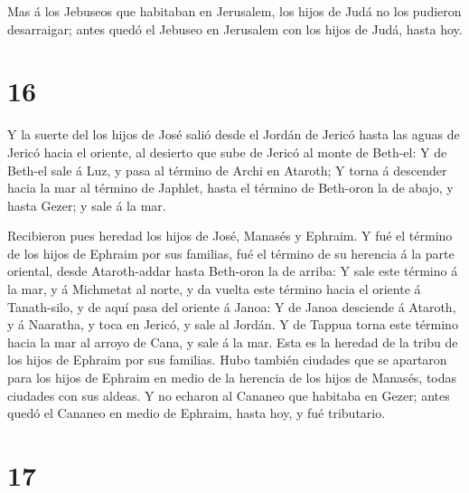  Mas á los Jebuseos que habitaban en Jerusalem, los hijos
de Judá no los pudieron desarraigar; antes quedó el Jebuseo en Jerusalem
con los hijos de Judá, hasta hoy.

\hypertarget{section-15}{%
\section{16}\label{section-15}}

 Y la suerte del los hijos de José salió desde el Jordán de
Jericó hasta las aguas de Jericó hacia el oriente, al desierto que sube
de Jericó al monte de Beth-el:  Y de Beth-el sale á Luz, y
pasa al término de Archi en Ataroth;  Y torna á descender
hacia la mar al término de Japhlet, hasta el término de Beth-oron la de
abajo, y hasta Gezer; y sale á la mar.

 Recibieron pues heredad los hijos de José, Manasés y
Ephraim.  Y fué el término de los hijos de Ephraim por sus
familias, fué el término de su herencia á la parte oriental, desde
Ataroth-addar hasta Beth-oron la de arriba:  Y sale este
término á la mar, y á Michmetat al norte, y da vuelta este término hacia
el oriente á Tanath-silo, y de aquí pasa del oriente á Janoa:
 Y de Janoa desciende á Ataroth, y á Naaratha, y toca en
Jericó, y sale al Jordán.  Y de Tappua torna este término
hacia la mar al arroyo de Cana, y sale á la mar. Esta es la heredad de
la tribu de los hijos de Ephraim por sus familias.  Hubo
también ciudades que se apartaron para los hijos de Ephraim en medio de
la herencia de los hijos de Manasés, todas ciudades con sus aldeas.
 Y no echaron al Cananeo que habitaba en Gezer; antes quedó
el Cananeo en medio de Ephraim, hasta hoy, y fué tributario.

\hypertarget{section-16}{%
\section{17}\label{section-16}}

